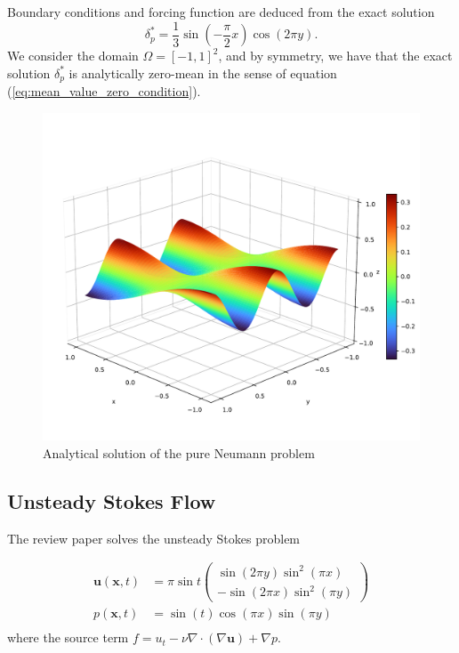 
Boundary conditions and forcing function are deduced from the exact solution
\begin{equation}
    \delta_p^* = \frac{1}{3} \sin\left(-\frac{\pi}{2} x \right) \cos\left(2\pi y\right).
\end{equation}
We consider the domain $\Omega = [-1, 1]^2$, and by symmetry, we have that the exact solution $\delta_p^*$ is analytically zero-mean in the sense of equation (\ref{eq:mean_value_zero_condition}).

\begin{figure}[htpb]
  \centering
  \includegraphics[width=0.5\linewidth]{img/dp_study_analytical.pdf}
  \caption{Analytical solution of the pure Neumann problem}
  \label{fig:dp_neumann_problem_analytical}
\end{figure}




\subsection{Unsteady Stokes Flow}

The review paper \cite{guermond_overview_2006} solves the unsteady Stokes problem

\begin{equation}
  \begin{aligned}
    \bm{u}(\bm{x}, t) &= \pi \sin t 
    \begin{pmatrix}
      \sin( 2\pi y) \sin^2( \pi x) \\
      -\sin(2 \pi x) \sin^2(\pi y)
    \end{pmatrix} \\
    p(\bm{x}, t) &= \sin(t)\cos(\pi x) \sin(\pi y)\\
  \end{aligned}
  \label{eq:MS_stokes_guermond}
\end{equation}
where the source term $f= u_t -\nu \nabla \cdot( \nabla \bm{u} ) + \nabla p $.

